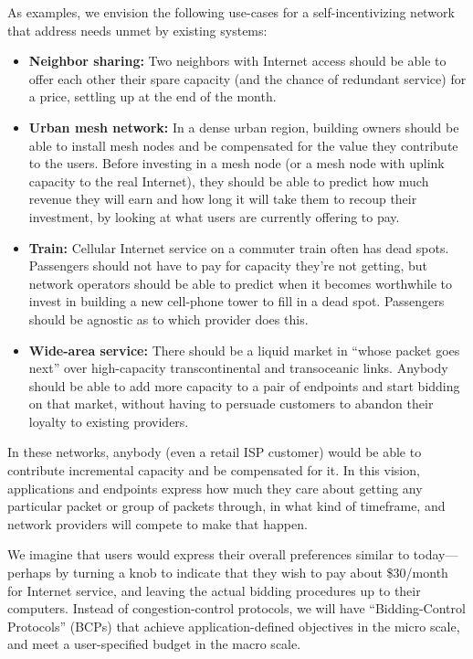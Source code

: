 As examples, we envision the following use-cases for a
self-incentivizing network that address needs unmet by existing systems:

\begin{itemize}
\item \textbf{Neighbor sharing:} Two neighbors with Internet access
  should be able to offer each other their spare capacity (and the
  chance of redundant service) for a price, settling up at the end of
  the month.

\item \textbf{Urban mesh network:} In a dense urban region, building
  owners should be able to install mesh nodes and be compensated for
  the value they contribute to the users. Before investing in a mesh
  node (or a mesh node with uplink capacity to the real Internet),
  they should be able to predict how much revenue they will earn and
  how long it will take them to recoup their investment, by looking at
  what users are currently offering to pay.

\item \textbf{Train:} Cellular Internet service on a commuter train
  often has dead spots. Passengers should not have to pay for capacity
  they're not getting, but network operators should be able to
  predict when it becomes worthwhile to invest in building a new
  cell-phone tower to fill in a dead spot. Passengers should be
  agnostic as to which provider does this.

\item \textbf{Wide-area service:} There should be a liquid market in
  ``whose packet goes next'' over high-capacity
  transcontinental and transoceanic links. Anybody should be able to
  add more capacity to a pair of endpoints and start bidding on that
  market, without having to persuade customers to abandon their
  loyalty to existing providers.

\end{itemize}

In these networks, anybody (even a retail ISP customer) would be able
to contribute incremental capacity and be compensated for it. In this
vision, applications and endpoints express how much they care about
getting any particular packet or group of packets through, in what
kind of timeframe, and network providers will compete to make that
happen.

We imagine that users would express their overall preferences similar
to today---perhaps by turning a knob to indicate that they wish to pay about \$30/month
for Internet service, and leaving the actual bidding procedures up to
their computers. Instead of congestion-control protocols, we will have
``Bidding-Control Protocols'' (BCPs) that achieve application-defined objectives in the
micro scale, and meet a user-specified budget in the macro scale.

